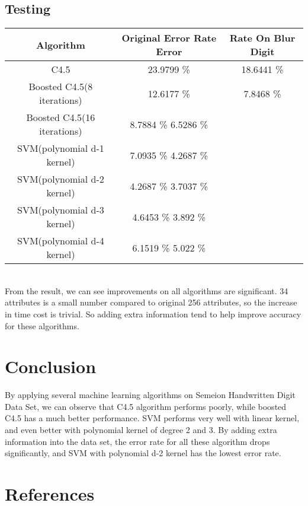 \documentclass[a4paper,11pt]{article}
\begin{document}
\subsection{Testing}
\vspace{0.5cm}
\begin{tabular}{c c c}
Algorithm		&	Original Error Rate	Error &Rate On Blur Digit\\
\hline \hline
C4.5		&		23.9799 \%		&18.6441 \%\\
Boosted C4.5(8 iterations)	&12.6177 \%		& 7.8468 \%\\
Boosted C4.5(16 iterations)	&8.7884 \%		 6.5286 \%\\
SVM(polynomial d-1 kernel)	&7.0935 \%		 4.2687 \%\\
SVM(polynomial d-2 kernel)	&4.2687 \%		 3.7037 \%\\
SVM(polynomial d-3 kernel)	&4.6453 \%		 3.892  \%\\
SVM(polynomial d-4 kernel)	&6.1519 \%		 5.022  \%\\
\end{tabular}
\vspace{0.5cm}\\
From the result, we can see improvements on all algorithms are significant. 34 attributes is a small number compared to original 256 attributes, so the increase in time cost is trivial. So adding extra information tend to help improve accuracy for these algorithms.
\section{Conclusion}
By applying several machine learning algorithms on Semeion Handwritten Digit Data Set, we can observe that C4.5 algorithm performs poorly, while boosted C4.5 has a much better performance. SVM performs very well with linear kernel, and even better with polynomial kernel of degree 2 and 3. By adding extra information into the data set, the error rate for all these algorithm drops significantly, and SVM with polynomial d-2 kernel has the lowest error rate.
\section{References}
\end{document}
